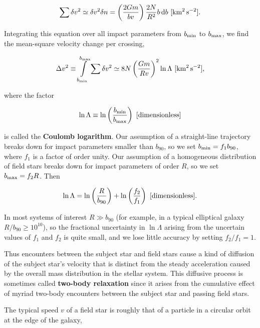 \documentclass[a4paper,10pt]{article}
\begin{document}
\begin{align*}
    \sum\delta v^2 \simeq \delta v^2 \delta n = \left(\frac{2Gm}{bv}\right) \frac{2N}{R^2} b\,{\rm d}b ~ [{\rm km^2\,s^{-2}}].
\end{align*}

{\noindent}Integrating this equation over all impact parameters from $b_{\rm min}$ to $b_{\rm max}$, we
find the mean-square velocity change per crossing,

\begin{align*}
    \Delta v^2 \equiv \int\limits_{b_{\rm min}}^{b_{\rm max}} \sum\delta v^2 \simeq 8N \left(\frac{Gm}{Rv}\right)^2 \ln \Lambda ~ [{\rm km^2\,s^{-2}}],
\end{align*}

{\noindent}where the factor

\begin{align*}
    \ln\Lambda \equiv \ln \left(\frac{b_{\rm min}}{b_{\rm max}}\right) ~ [{\rm dimensionless}]
\end{align*}

{\noindent}is called the \textbf{Coulomb logarithm}. Our assumption of a straight-line trajectory breaks down for impact parameters smaller than $b_{90}$, so we set $b_{\rm min}=f_1b_{90}$, where $f_1$ is a factor of order unity. Our assumption of a homogeneous distribution of field stars breaks down for impact parameters of order $R$, so we set $b_{\rm max}=f_2R$. Then

\begin{align*}
    \ln\Lambda = \ln \left(\frac{R}{b_{90}}\right) + \ln \left(\frac{f_2}{f_1}\right) ~ [{\rm dimensionless}].
\end{align*}

{\noindent}In most systems of interest $R\gg b_{90}$ (for example, in a typical elliptical galaxy $R/b_{90}\geq10^{10}$), so the fractional uncertainty in $\ln\Lambda$ arising from the uncertain values of $f_1$ and $f_2$ is quite small, and we lose little accuracy by setting $f_2/f_1=1$.

{\noindent}Thus encounters between the subject star and field stars cause a kind of diffusion of the subject star's velocity that is distinct from the steady acceleration caused by the overall mass distribution in the stellar system. This diffusive process is sometimes called \textbf{two-body relaxation} since it arises from the cumulative effect of myriad two-body encounters between the subject star and passing field stars.

{\noindent}The typical speed $v$ of a field star is roughly that of a particle in a circular orbit at the edge of the galaxy,
\end{document}
